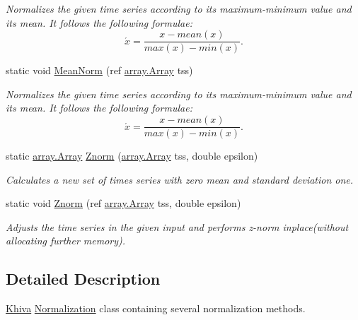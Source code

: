 \begin{DoxyCompactItemize}
\begin{DoxyCompactList}\small\item\em Normalizes the given time series according to its maximum-\/minimum value and its mean. It follows the following formulae\+: \[ \acute{x} = \frac{x - mean(x)}{max(x) - min(x)}. \] \end{DoxyCompactList}\item 
static void \mbox{\hyperlink{classkhiva_1_1normalization_1_1_normalization_a0ea50b378b754403bf80a895a7ddb63f}{Mean\+Norm}} (ref \mbox{\hyperlink{classkhiva_1_1array_1_1_array}{array.\+Array}} tss)
\begin{DoxyCompactList}\small\item\em Normalizes the given time series according to its maximum-\/minimum value and its mean. It follows the following formulae\+: \[ \acute{x} = \frac{x - mean(x)}{max(x) - min(x)}. \] \end{DoxyCompactList}\item 
static \mbox{\hyperlink{classkhiva_1_1array_1_1_array}{array.\+Array}} \mbox{\hyperlink{classkhiva_1_1normalization_1_1_normalization_a20d08a7e62353599b85bb223ee2b07bc}{Znorm}} (\mbox{\hyperlink{classkhiva_1_1array_1_1_array}{array.\+Array}} tss, double epsilon)
\begin{DoxyCompactList}\small\item\em Calculates a new set of times series with zero mean and standard deviation one. \end{DoxyCompactList}\item 
static void \mbox{\hyperlink{classkhiva_1_1normalization_1_1_normalization_a708ca228ebe1822c77eabf8a78338747}{Znorm}} (ref \mbox{\hyperlink{classkhiva_1_1array_1_1_array}{array.\+Array}} tss, double epsilon)
\begin{DoxyCompactList}\small\item\em Adjusts the time series in the given input and performs z-\/norm inplace(without allocating further memory). \end{DoxyCompactList}\end{DoxyCompactItemize}


\subsection{Detailed Description}
\mbox{\hyperlink{classkhiva_1_1_khiva}{Khiva}} \mbox{\hyperlink{classkhiva_1_1normalization_1_1_normalization}{Normalization}} class containing several normalization methods. 



